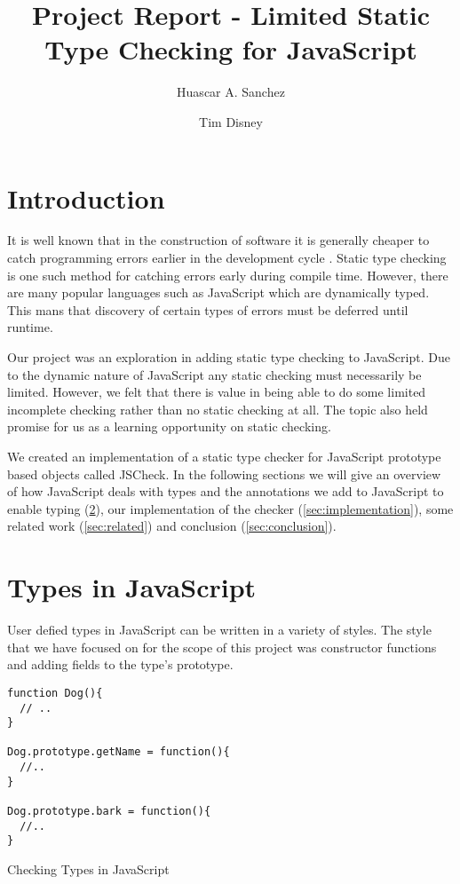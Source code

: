 \documentclass{article}
\begin{document}
\title{Project Report - Limited Static Type Checking for JavaScript}
\author{Huascar A. Sanchez \and Tim Disney}

\maketitle

\lstset{showstringspaces=false}

\section{Introduction}
It is well known that in the construction of software it is generally 
cheaper to catch programming errors earlier in the development cycle \cite{cc2}.
Static type checking is one such method for catching errors early during compile time.
However, there are many popular languages such as JavaScript which are dynamically 
typed. This mans that discovery of certain types of errors must be deferred until runtime.

Our project was an exploration in adding static type checking to JavaScript. Due to 
the dynamic nature of JavaScript any static checking must necessarily be limited. 
However, we felt that there is value in being able to do some limited incomplete
checking rather than no static checking at all. The topic also held promise for us as a learning
opportunity on static checking.

We created an implementation of a static type checker for JavaScript prototype 
based objects called JSCheck. In the following sections we will give an overview
of how JavaScript deals with types and the annotations we add to JavaScript to enable
typing (\ref{sec:types}), our implementation of the
checker (\ref{sec:implementation}), some related work (\ref{sec:related}) and 
conclusion (\ref{sec:conclusion}).

\section{Types in JavaScript}
\label{sec:types}
User defied types in JavaScript can be written in a variety of styles. The style
that we have focused on for the scope of this project was constructor functions and
adding fields to the type's prototype.

\begin{program}
\begin{verbatim}
function Dog(){
  // ..
}

Dog.prototype.getName = function(){
  //..
}

Dog.prototype.bark = function(){
  //..
}
\end{verbatim}
\caption{Checking Types in JavaScript}
\label{fig:object}
\end{program}
\end{document}
